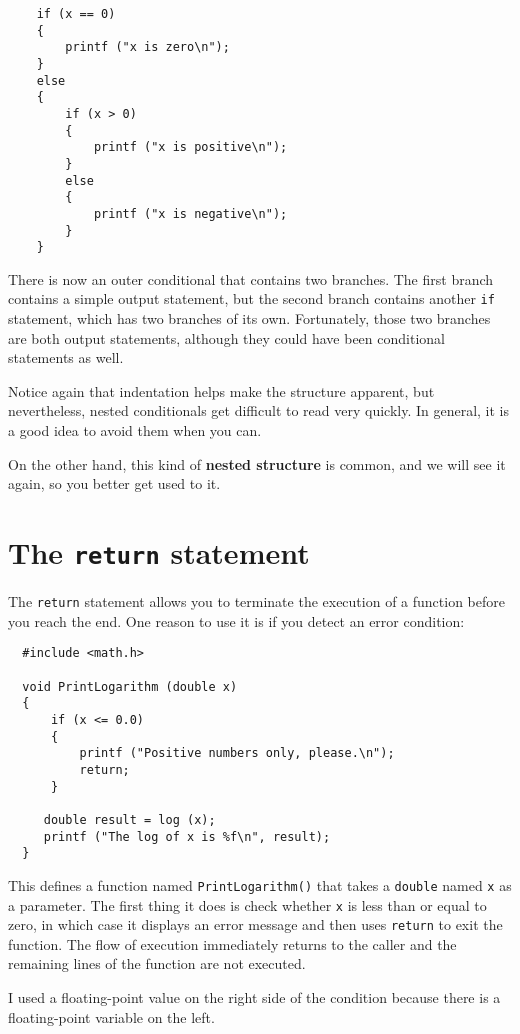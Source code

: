 \begin{verbatim}
    if (x == 0) 
    {
        printf ("x is zero\n");
    } 
    else 
    {
        if (x > 0) 
        {
            printf ("x is positive\n");
        }
        else 
        {
            printf ("x is negative\n");
        }
    }
\end{verbatim}
%
There is now an outer conditional that contains two branches.  The
first branch contains a simple output statement, but the second
branch contains another {\tt if} statement, which has two branches
of its own.  Fortunately, those two branches are both output
statements, although they could have been conditional statements as
well.

Notice again that indentation helps make the structure
apparent, but nevertheless, nested conditionals get difficult to read
very quickly.  In general, it is a good idea to avoid them when you
can.


On the other hand, this kind of {\bf nested structure} is common, and
we will see it again, so you better get used to it.

\section{The {\tt return} statement}

The {\tt return} statement allows you to terminate the execution
of a function before you reach the end.  One reason to use it
is if you detect an error condition:

\begin{verbatim}
  #include <math.h>

  void PrintLogarithm (double x) 
  {
      if (x <= 0.0) 
      {
          printf ("Positive numbers only, please.\n");
          return;
      }

     double result = log (x);
     printf ("The log of x is %f\n", result);
  }
\end{verbatim}
%
This defines a function named {\tt PrintLogarithm()} that takes
a {\tt double} named {\tt x} as a parameter.  The first thing
it does is check whether {\tt x} is less than or equal to
zero, in which case it displays an error message and then uses
{\tt return} to exit the function.  The flow of execution
immediately returns to the caller and the remaining lines of
the function are not executed.

I used a floating-point value on the right side of the condition
because there is a floating-point variable on the left.

